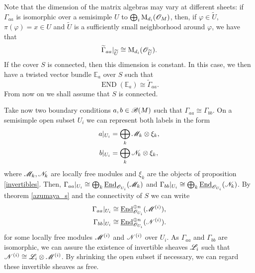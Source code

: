 Note that the dimension of the matrix algebras may vary at different sheets: if $\Gamma_{aa}$ is isomorphic over a semisimple $U$ to $\bigoplus_{i}\operatorname{M}_{d_i}(\mathscr{O}_M)$, then, if $\varphi \in \widetilde{U}$, $\pi (\varphi )=x\in U$ and $\widetilde{U}$ is a sufficiently small neighborhood around $\varphi$, we have that
$$\widetilde{\Gamma}_{aa}|_{\widetilde{U}}\cong \operatorname{M}_{d_i}(\mathscr{O}_{\widetilde{U}}).$$
If the cover $S$ is connected, then this dimension is constant. In this case, we then have a twisted vector bundle $\mathbb{E}_a$ over $S$ such that
$$\operatorname{END}(\mathbb{E}_a)\cong \widetilde{\Gamma}_{aa}.$$
From now on we shall assume that $S$ is connected.

Take now two boundary conditions $a,b\in \mathscr{B}(M)$ such that $\Gamma_{aa}\cong \Gamma_{bb}$. On a semisimple open subset $U_i$ we can represent both labels in the form
$$
\begin{aligned}
a|_{U_i}&=\bigoplus_k\mathscr{M}_k\otimes \xi_k, \\
b|_{U_i}&=\bigoplus_k\mathscr{N}_k\otimes \xi_k, \\
\end{aligned}
$$
where $\mathscr{M}_k,\mathscr{N}_k$ are locally free modules and $\xi_k$ are the objects of proposition \ref{invertibles}. Then, $\Gamma_{aa}|_{U_i}\cong \bigoplus_k\underline{\operatorname{End}}_{\mathscr{O}_{U_i}}(\mathscr{M}_k)$ and $\Gamma_{bb}|_{U_i}\cong \bigoplus_k\underline{\operatorname{End}}_{\mathscr{O}_{U_i}}(\mathscr{N}_k)$. By theorem \ref{azumaya_s} and the connectivity of $S$ we can write
\begin{equation}\label{global_labels_local_rep}
\begin{aligned}
\Gamma_{aa}|_{U_i}&\cong \underline{\operatorname{End}}^{\oplus n}_{\mathscr{O}_{U_i}}(\mathscr{M}^{(i)}), \\
\Gamma_{bb}|_{U_i}&\cong \underline{\operatorname{End}}^{\oplus n}_{\mathscr{O}_{U_i}}(\mathscr{N}^{(i)}). \\
\end{aligned}
\end{equation}
for some locally free modules $\mathscr{M}^{(i)}$ and $\mathscr{N}^{(i)}$ over $U_i$. As $\Gamma_{aa}$ and $\Gamma_{bb}$ are isomorphic, we can assure the existence of invertible sheaves $\mathscr{L}_i$ such that $\mathscr{N}^{(i)}\cong \mathscr{L}_i\otimes \mathscr{M}^{(i)}$. By shrinking the open subset if necessary, we can regard these invertible sheaves as free.

